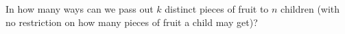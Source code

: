 \documentclass{book}
\begin{document}
\setcounter{project}{88}
\addtocounter{project}{-1}
\begin{activity}[]\label{activity-81}
\hypertarget{p-682}{}%
In how many ways can we pass out \(k\) distinct pieces of fruit to \(n\) children (with no restriction on how many pieces of fruit a child may get)?%
\end{activity}
\end{document}
